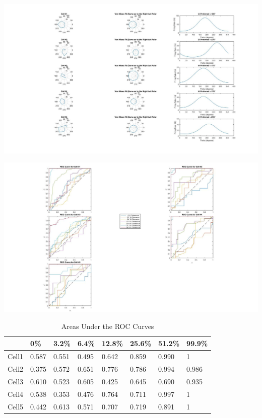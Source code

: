 \documentclass{121Temp}
\begin{document}
\maketitle

\hwproblem
\label{Qa}
\includegraphics[scale=.35]{part1.jpg}


\hwproblem

\includegraphics[scale=.40]{roc_curves}


\begin{table}[H]
\centering
\caption{Areas Under the ROC Curves}
\label{my-label}
\begin{tabular}{|l|l|l|l|l|l|l|l|}
\hline
      & 0\%   & 3.2\% & 6.4\% & 12.8\% & 25.6\% & 51.2\% & 99.9\% \\ \hline
Cell1 & 0.587 & 0.551 & 0.495 & 0.642  & 0.859  & 0.990  & 1      \\ \hline
Cell2 & 0.375 & 0.572 & 0.651 & 0.776  & 0.786  & 0.994  & 0.986  \\ \hline
Cell3 & 0.610 & 0.523 & 0.605 & 0.425  & 0.645  & 0.690  & 0.935  \\ \hline
Cell4 & 0.538 & 0.353 & 0.476 & 0.764  & 0.711  & 0.997  & 1      \\ \hline
Cell5 & 0.442 & 0.613 & 0.571 & 0.707  & 0.719  & 0.891  & 1      \\ \hline
\end{tabular}
\end{table}
\end{document}
